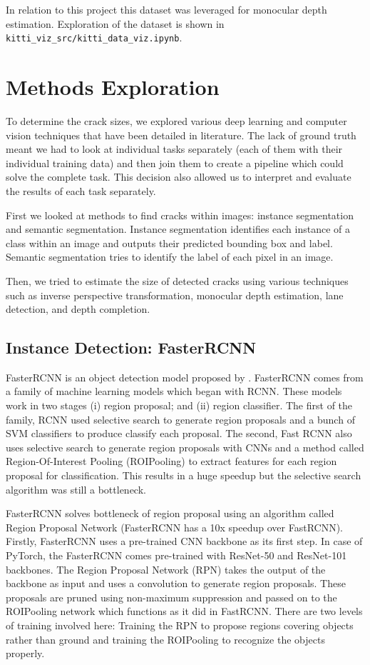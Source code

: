 \documentclass{article}
\begin{document}
In relation to this project this dataset was leveraged for monocular depth estimation. Exploration of the dataset is shown in \verb|kitti_viz_src/kitti_data_viz.ipynb|.


\section{Methods Exploration}
To determine the crack sizes, we explored various deep learning and computer vision techniques that have been detailed in literature.
The lack of ground truth meant we had to look at individual tasks separately (each of them with their individual training data) and then join them to create a pipeline which could solve the complete task. This decision also allowed us to interpret and evaluate the results of each task separately.

First we looked at methods to find cracks within images: instance segmentation and semantic segmentation. Instance segmentation identifies each instance of a class within an image and outputs their predicted bounding box and label. Semantic segmentation tries to identify the label of each pixel in an image.

Then, we tried to estimate the size of detected cracks using various techniques such as inverse perspective transformation, monocular depth estimation, lane detection, and depth completion.  


\subsection{Instance Detection: FasterRCNN}
FasterRCNN is an object detection model proposed by \cite{NIPS2015_14bfa6bb}. FasterRCNN comes from a family of machine learning models which began with RCNN. These models work in two stages (i) region proposal; and (ii) region classifier. The first of the family, RCNN used selective search to generate region proposals and a bunch of SVM classifiers to produce classify each proposal. The second, Fast RCNN also uses selective search to generate region proposals with CNNs and a method called Region-Of-Interest Pooling (ROIPooling) to extract features for each region proposal for classification. This results in a huge speedup but the selective search algorithm was still a bottleneck.

FasterRCNN solves bottleneck of region proposal using an algorithm called Region Proposal Network (FasterRCNN has a 10x speedup over FastRCNN). Firstly, FasterRCNN uses a pre-trained CNN backbone as its first step. In case of PyTorch, the FasterRCNN comes pre-trained with  ResNet-50 and ResNet-101 backbones. The Region Proposal Network (RPN) takes the output of the backbone as input and uses a convolution to generate region proposals. These proposals are pruned using non-maximum suppression and passed on to the ROIPooling network which functions as it did in FastRCNN. There are two levels of training involved here: Training the RPN to propose regions covering objects rather than ground and training the ROIPooling to recognize the objects properly. 
\end{document}

